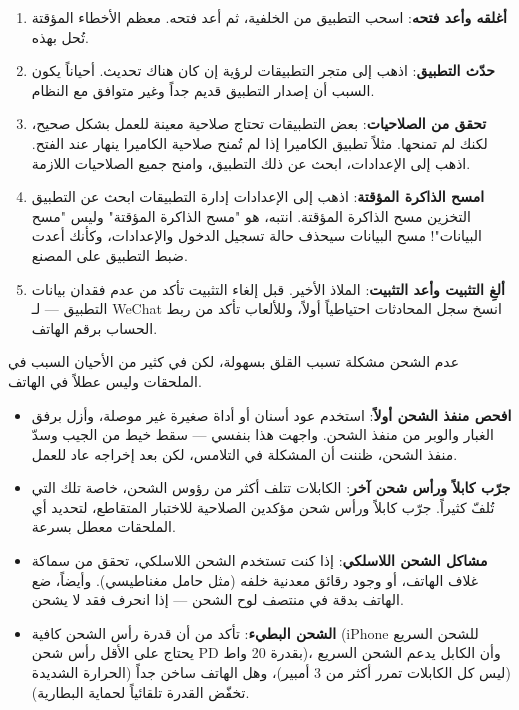 \begin{enumerate}
  \item \textbf{أغلقه وأعد فتحه}: اسحب التطبيق من الخلفية، ثم أعد فتحه. معظم الأخطاء المؤقتة تُحل بهذه.
  \item \textbf{حدّث التطبيق}: اذهب إلى متجر التطبيقات لرؤية إن كان هناك تحديث. أحياناً يكون السبب أن إصدار التطبيق قديم جداً وغير متوافق مع النظام.
  \item \textbf{تحقق من الصلاحيات}: بعض التطبيقات تحتاج صلاحية معينة للعمل بشكل صحيح، لكنك لم تمنحها. مثلاً تطبيق الكاميرا إذا لم تُمنح صلاحية الكاميرا ينهار عند الفتح. اذهب إلى الإعدادات، ابحث عن ذلك التطبيق، وامنح جميع الصلاحيات اللازمة.
  \item \textbf{امسح الذاكرة المؤقتة}: اذهب إلى الإعدادات إدارة التطبيقات ابحث عن التطبيق التخزين مسح الذاكرة المؤقتة. انتبه، هو "مسح الذاكرة المؤقتة" وليس "مسح البيانات"! مسح البيانات سيحذف حالة تسجيل الدخول والإعدادات، وكأنك أعدت ضبط التطبيق على المصنع.
  \item \textbf{ألغِ التثبيت وأعد التثبيت}: الملاذ الأخير. قبل إلغاء التثبيت تأكد من عدم فقدان بيانات التطبيق — لـ WeChat انسخ سجل المحادثات احتياطياً أولاً، وللألعاب تأكد من ربط الحساب برقم الهاتف.
\end{enumerate}


عدم الشحن مشكلة تسبب القلق بسهولة، لكن في كثير من الأحيان السبب في الملحقات وليس عطلاً في الهاتف.

\begin{itemize}
  \item \textbf{افحص منفذ الشحن أولاً}: استخدم عود أسنان أو أداة صغيرة غير موصلة، وأزل برفق الغبار والوبر من منفذ الشحن. واجهت هذا بنفسي — سقط خيط من الجيب وسدّ منفذ الشحن، ظننت أن المشكلة في التلامس، لكن بعد إخراجه عاد للعمل.
  \item \textbf{جرّب كابلاً ورأس شحن آخر}: الكابلات تتلف أكثر من رؤوس الشحن، خاصة تلك التي تُلفّ كثيراً. جرّب كابلاً ورأس شحن مؤكدين الصلاحية للاختبار المتقاطع، لتحديد أي الملحقات معطل بسرعة.
  \item \textbf{مشاكل الشحن اللاسلكي}: إذا كنت تستخدم الشحن اللاسلكي، تحقق من سماكة غلاف الهاتف، أو وجود رقائق معدنية خلفه (مثل حامل مغناطيسي). وأيضاً، ضع الهاتف بدقة في منتصف لوح الشحن — إذا انحرف فقد لا يشحن.
  \item \textbf{الشحن البطيء}: تأكد من أن قدرة رأس الشحن كافية (iPhone للشحن السريع يحتاج على الأقل رأس شحن PD بقدرة 20 واط)، وأن الكابل يدعم الشحن السريع (ليس كل الكابلات تمرر أكثر من 3 أمبير)، وهل الهاتف ساخن جداً (الحرارة الشديدة تخفّض القدرة تلقائياً لحماية البطارية).
\end{itemize}

